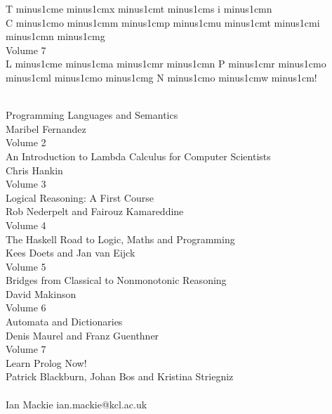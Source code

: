 \documentclass[twoside,leqno,10pt]{book}
\begin{document}
\thispagestyle{empty}
\def\sqz{\hskip0pt minus1cm}
\vspace*{2cm}

\begin{center}
{\jlctitleA T\sqz e\sqz x\sqz t\sqz s i\sqz n}\\[3ex]
{\jlctitleA C\sqz o\sqz m\sqz p\sqz u\sqz t\sqz i\sqz n\sqz g}\\[3ex]
{\jlctitleB Volume 7}\\[18ex]

{\jlctitleC L\sqz e\sqz a\sqz r\sqz n P\sqz r\sqz o\sqz l\sqz o\sqz g N\sqz o\sqz w\sqz !}

\end{center}
\newpage\thispagestyle{empty}
\newpage\thispagestyle{empty}

\mbox{}
\vfill

\\
{\sf Programming Languages and Semantics}\\
{\sf Maribel Fernandez}\\[1ex]
 {\sf Volume 2}\\
 {\sf An Introduction to Lambda Calculus for Computer Scientists}\\
 {\sf Chris Hankin}\\[1ex]
 {\sf Volume 3}\\
{\sf Logical Reasoning: A First Course}\\
{\sf Rob Nederpelt and Fairouz Kamareddine}\\[1ex]
 {\sf Volume 4}\\
{\sf The Haskell Road to Logic, Maths and Programming}\\
{\sf Kees Doets and Jan van Eijck}\\[1ex]
{\sf Volume 5}\\
{\sf Bridges from Classical to Nonmonotonic Reasoning}\\
{\sf  David Makinson}\\[1ex]
{\sf Volume 6}\\
{\sf Automata and Dictionaries}\\
{\sf  Denis Maurel and Franz Guenthner}\\[1ex]
{\sf Volume 7}\\
{\sf Learn Prolog Now!}\\
{\sf  Patrick Blackburn, Johan Bos and Kristina Striegniz}\\[1ex]

  \\
 {\sf Ian Mackie  \hfill  ian.mackie@kcl.ac.uk}\\
\end{document}
